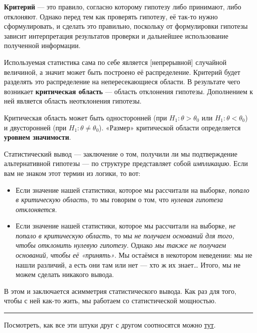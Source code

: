 \documentclass[
  letterpaper,
  DIV=11,
  numbers=noendperiod]{scrreprt}
\providecommand{\tightlist}{%
  \setlength{\itemsep}{0pt}\setlength{\parskip}{0pt}}\usepackage{longtable,booktabs,array}
\theoremstyle{definition}
\theoremstyle{remark}
\begin{document}
\textbf{Критерий} --- это правило, согласно которому гипотезу либо
принимают, либо отклоняют. Однако перед тем как проверять гипотезу, её
так-то нужно сформулировать, и сделать это правильно, поскольку от
формулировки гипотезы зависит интерпретация результатов проверки и
дальнейшее использование полученной информации.

Используемая статистика сама по себе является {[}непрерывной{]}
случайной величиной, а значит может быть построено её распределение.
Критерий будет разделять это распределение на непересекающиеся области.
В результате чего возникает \textbf{критическая область} --- область
отклонения гипотезы. Дополнением к ней является область неотклонения
гипотезы.

Критическая область может быть односторонней (при
\(H_1:\theta > \theta_0\) или \(H_1: \theta < \theta_0\)) и двусторонней
(при \(H_1:\theta \neq \theta_0\)). «Размер» критической области
определяется \textbf{уровнем значимости}.

Статистический вывод --- заключение о том, получили ли мы подтверждение
альтернативной гипотезы --- по структуре представляет собой
\emph{импликацию}. Если вам не знаком этот термин из логики, то вот:

\begin{itemize}
\tightlist
\item
  Если значение нашей статистики, которое мы рассчитали на выборке,
  \emph{попало в критическую область}, то мы говорим о том, что
  \emph{нулевая гипотеза отклоняется}.
\item
  Если значение нашей статистики, которое мы рассчитали на выборке,
  \emph{не попало в критическую область}, то мы \emph{не получаем
  оснований для того, чтобы отклонить нулевую гипотезу}. Однако \emph{мы
  также не получаем оснований, чтобы её «принять»}. Мы остаёмся в
  некотором неведении: мы не нашли различий, а есть они там или нет ---
  хто ж их знает\ldots{} Итого, мы не можем сделать никакого вывода.
\end{itemize}

В этом и заключается асимметрия статистического вывода. Как раз для
того, чтобы с ней как-то жить, мы работаем со статистической мощностью.

\begin{center}\rule{0.5\linewidth}{0.5pt}\end{center}

Посмотреть, как все эти штуки друг с другом соотносятся можно
\href{https://rpsychologist.com/d3/nhst/}{тут}.
\end{document}

